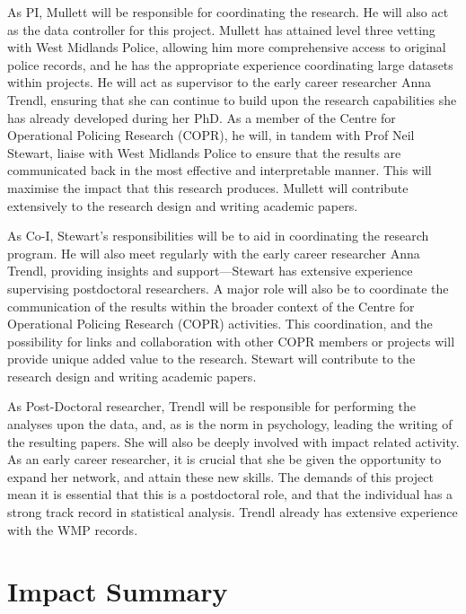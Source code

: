 \documentclass[11pt, a4paper]{article}
\begin{document}
As PI, Mullett will be responsible for coordinating the research. He will also act as the data controller for this project. Mullett has attained level three vetting with West Midlands Police, allowing him more comprehensive access to original police records, and he has the appropriate experience coordinating large datasets within projects. He will act as supervisor to the early career researcher Anna Trendl, ensuring that she can continue to build upon the research capabilities she has already developed during her PhD. As a member of the Centre for Operational Policing Research (COPR), he will, in tandem with Prof Neil Stewart, liaise with West Midlands Police to ensure that the results are communicated back in the most effective and interpretable manner. This will maximise the impact that this research produces. Mullett will contribute extensively to the research design and writing academic papers.

As Co-I, Stewart's responsibilities will be to aid in coordinating the research program. He will also meet regularly with the early career researcher Anna Trendl, providing insights and support---Stewart has extensive experience supervising postdoctoral researchers. A major role will also be to coordinate the communication of the results within the broader context of the Centre for Operational Policing Research (COPR) activities. This coordination, and the possibility for links and collaboration with other COPR members or projects will provide unique added value to the research. Stewart will contribute to the research design and writing academic papers.

As Post-Doctoral researcher, Trendl will be responsible for performing the analyses upon the data, and, as is the norm in psychology, leading the writing of the resulting papers. She will also be deeply involved with impact related activity. As an early career researcher, it is crucial that she be given the opportunity to expand her network, and attain these new skills. The demands of this project mean it is essential that this is a postdoctoral role, and that the individual has a strong track record in statistical analysis. Trendl already has extensive experience with the WMP records.  



\section{Impact Summary }
\end{document}
